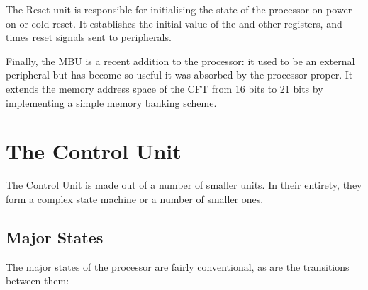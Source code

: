 The Reset unit is responsible for initialising the state of the processor on
power on or cold reset. It establishes the initial value of the \PC{} and other
registers, and times reset signals sent to peripherals.

Finally, the \unit{MBU} is a recent addition to the processor: it used to be an
external peripheral but has become so useful it was absorbed by the processor
proper. It extends the memory address space of the CFT from 16 bits to 21 bits
by implementing a simple memory banking scheme.

\section{The Control Unit}
\label{sec:control-unit}

The Control Unit is made out of a number of smaller units. In their
entirety, they form a complex state machine or a number of smaller
ones.

\subsection{Major States}
\label{sec:major-states}

The major states of the processor are fairly conventional, as are the transitions between them:

